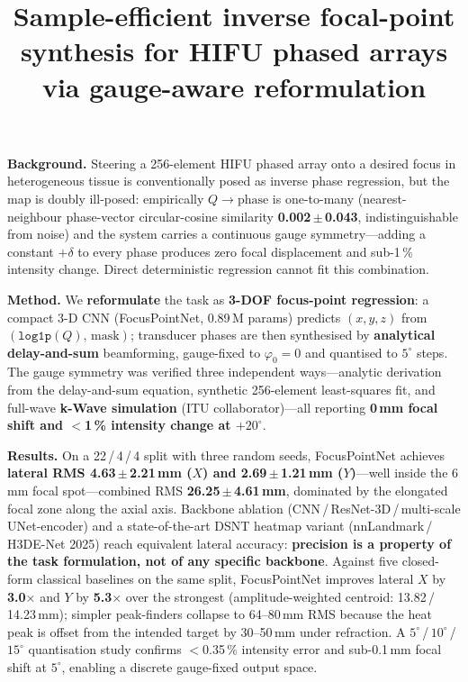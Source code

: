\documentclass[11pt,a4paper]{article}
\begin{document}
\title{Sample-efficient inverse focal-point synthesis for HIFU phased arrays
       via gauge-aware reformulation}
\date{}
\maketitle

\noindent
\textbf{Background.}
Steering a 256-element HIFU phased array onto a desired focus in heterogeneous
tissue is conventionally posed as inverse phase regression, but the map is
doubly ill-posed: empirically $Q\to\text{phase}$ is one-to-many
(nearest-neighbour phase-vector circular-cosine similarity
\textbf{0.002\,$\pm$\,0.043}, indistinguishable from noise) and the system
carries a continuous gauge symmetry---adding a constant $+\delta$ to every
phase produces zero focal displacement and sub-1\,\% intensity change.
Direct deterministic regression cannot fit this combination.

\noindent
\textbf{Method.}
We \textbf{reformulate} the task as \textbf{3-DOF focus-point regression}: a
compact 3-D CNN (FocusPointNet, 0.89\,M params) predicts $(x,y,z)$ from
$(\texttt{log1p}(Q),\,\text{mask})$; transducer phases are then synthesised by
\textbf{analytical delay-and-sum} beamforming, gauge-fixed to $\varphi_0=0$
and quantised to $5^\circ$ steps.
The gauge symmetry was verified three independent ways---analytic derivation
from the delay-and-sum equation, synthetic 256-element least-squares fit, and
full-wave \textbf{k-Wave simulation} (ITU collaborator)---all reporting
\textbf{0\,mm focal shift and $<$1\,\% intensity change at $+20^\circ$}.

\noindent
\textbf{Results.}
On a 22\,/\,4\,/\,4 split with three random seeds, FocusPointNet achieves
\textbf{lateral RMS 4.63\,$\pm$\,2.21\,mm ($X$) and 2.69\,$\pm$\,1.21\,mm
($Y$)}---well inside the 6\,mm focal spot---combined RMS
\textbf{26.25\,$\pm$\,4.61\,mm}, dominated by the elongated focal zone along
the axial axis.
Backbone ablation (CNN\,/\,ResNet-3D\,/\,multi-scale UNet-encoder) and a
state-of-the-art DSNT heatmap variant (nnLandmark\,/\,H3DE-Net 2025) reach
equivalent lateral accuracy: \textbf{precision is a property of the task
formulation, not of any specific backbone}.
Against five closed-form classical baselines on the same split, FocusPointNet
improves lateral $X$ by \textbf{3.0$\times$} and $Y$ by \textbf{5.3$\times$}
over the strongest (amplitude-weighted centroid: 13.82\,/\,14.23\,mm); simpler
peak-finders collapse to 64--80\,mm RMS because the heat peak is offset from
the intended target by 30--50\,mm under refraction.
A $5^\circ$\,/\,$10^\circ$\,/\,$15^\circ$ quantisation study confirms
$<$0.35\,\% intensity error and sub-0.1\,mm focal shift at $5^\circ$, enabling
a discrete gauge-fixed output space.
\end{document}
